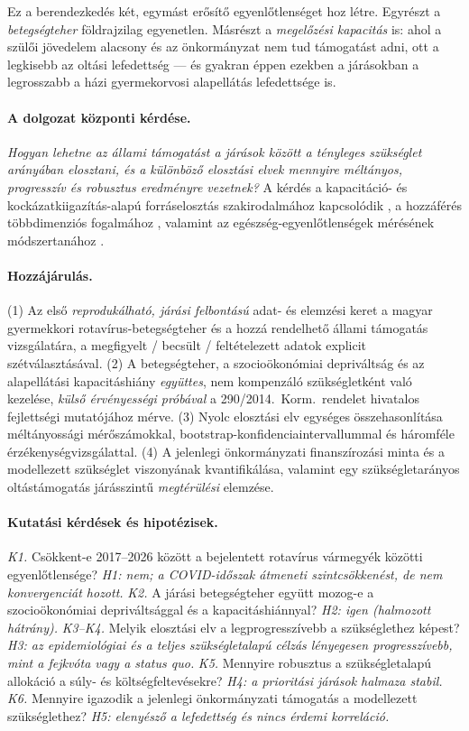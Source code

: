 \documentclass[12pt,a4paper]{article}
\begin{document}
Ez a berendezkedés két, egymást erősítő egyenlőtlenséget hoz létre. Egyrészt
a \emph{betegségteher} földrajzilag egyenetlen. Másrészt a \emph{megelőzési
kapacitás} is: ahol a szülői jövedelem alacsony és az önkormányzat nem tud
támogatást adni, ott a legkisebb az oltási lefedettség --- és gyakran éppen
ezekben a járásokban a legrosszabb a házi gyermekorvosi alapellátás
lefedettsége is.

\paragraph{A dolgozat központi kérdése.}
\emph{Hogyan lehetne az állami támogatást a járások között a tényleges
szükséglet arányában elosztani, és a különböző elosztási elvek mennyire
méltányos, progresszív és robusztus eredményre vezetnek?} A kérdés a
kapacitáció- és kockázatkiigazítás-alapú forráselosztás szakirodalmához
kapcsolódik \citep{rice2001}, a hozzáférés több\-dimenziós fogalmához
\citep{penchansky1981}, valamint az egészség-egyenlőtlenségek mérésének
módszertanához \citep{wagstaff1991,odonnell2008,kakwani1977}.

\paragraph{Hozzájárulás.}
(1) Az első \emph{reprodukálható, járási felbontású} adat- és elemzési keret a
magyar gyermekkori rotavírus-betegségteher és a hozzá rendelhető állami
támogatás vizsgálatára, a megfigyelt / becsült / feltételezett adatok
explicit szétválasztásával. (2) A betegségteher, a szocioökonómiai
depriváltság és az alapellátási kapacitáshiány \emph{együttes}, nem
kompenzáló szükségletként való kezelése, \emph{külső érvényességi próbával} a
290/2014.\ Korm.\ rendelet hivatalos fejlettségi mutatójához mérve. (3) Nyolc
elosztási elv egységes összehasonlítása méltányossági mérőszámokkal,
bootstrap-konfidenciaintervallummal és háromféle érzékenységvizsgálattal.
(4) A jelenlegi önkormányzati finanszírozási minta és a modellezett
szükséglet viszonyának kvantifikálása, valamint egy szükségletarányos
oltástámogatás járásszintű \emph{megtérülési} elemzése.

\paragraph{Kutatási kérdések és hipotézisek.}
\emph{K1.} Csökkent-e 2017--2026 között a bejelentett rotavírus vármegyék
közötti egyenlőtlensége? \emph{H1: nem; a COVID-időszak átmeneti
szintcsökkenést, de nem konvergenciát hozott.}
\emph{K2.} A járási betegségteher együtt mozog-e a szocioökonómiai
depriváltsággal és a kapacitáshiánnyal? \emph{H2: igen (halmozott hátrány).}
\emph{K3--K4.} Melyik elosztási elv a legprogresszívebb a szükséglethez
képest? \emph{H3: az epidemiológiai és a teljes szükségletalapú célzás
lényegesen progresszívebb, mint a fejkvóta vagy a status quo.}
\emph{K5.} Mennyire robusztus a szükségletalapú allokáció a súly- és
költségfeltevésekre? \emph{H4: a prioritási járások halmaza stabil.}
\emph{K6.} Mennyire igazodik a jelenlegi önkormányzati támogatás a
modellezett szükséglethez? \emph{H5: elenyésző a lefedettség és nincs érdemi
korreláció.}
\end{document}
